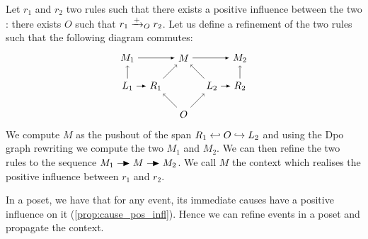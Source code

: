 Let $r_1$ and $r_2$ two rules such that there exists a positive influence between the two : there exists $O$ such that $r_1 \mathrel{\xrightarrow{+}}_O r_2$. Let us define a refinement of the two rules
such that the following diagram commutes:
\[
\begin{tikzpicture} %
  \node (o) at (0,-1) {\(O\)};
  \node (p) at (0,1) {\(M\)};
  \node (r1) at (-1,0) {\(R_1\)};
  \node (l1) at (-2,0) {\(L_1\)};
  \node (l2) at (1,0) {\(L_2\)};
  \node (r2) at (2,0) {\(R_2\)};
  \node (m1) at (-2,1) {\(M_1\)};
  \node (m2) at (2,1) {\(M_2\)};
  \draw [->] (l1) -- (m1);
  \draw [->] (r2) -- (m2);
  \draw [->] (o) -- (r1);
  \draw [->] (o) -- (l2);
  \draw [->] (r1) -- (p);
  \draw [->] (l2) -- (p);
  \draw [>=latex, ->] (m1) -- (p);
  \draw [>=latex, ->] (p) -- (m2);
  \draw [>=latex, ->] (l1) -- (r1);
  \draw [>=latex, ->] (l2) -- (r2);
\end{tikzpicture}
\]
We compute $M$ as the pushout of the span $R_1\hookleftarrow O\hookrightarrow L_2$ and using the Dpo graph rewriting we compute the two $M_1$ and $M_2$. We can then refine the two rules to the sequence $M_1\action M\action M_2$. We call $M$ the context which realises the positive influence between $r_1$ and $r_2$.

In a poset, we have that for any event, its immediate causes have a positive influence on it (\autoref{prop:cause_pos_infl}). Hence we can refine events in a poset and propagate the context.


